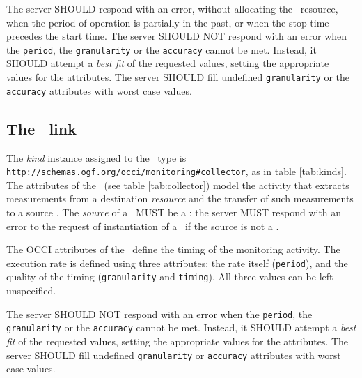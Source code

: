 \documentclass[10pt,a4paper]{article}
\begin{document}
The server SHOULD respond with an error, without allocating the \sens\ resource, when the period of operation is partially in the past, or when the stop time precedes the start time. The server SHOULD NOT respond with an error when the {\tt period}, the {\tt granularity} or the {\tt accuracy} cannot be met. Instead, it SHOULD attempt a {\em best fit} of the requested values, setting the appropriate values for the attributes. The server SHOULD fill undefined {\tt granularity} or the {\tt accuracy} attributes with worst case values. 

\subsection{The \coll\ link \label{sec:collector}}


The {\em kind} instance assigned to the \coll\ type is {\tt http://schemas.ogf.org/occi/monitoring\#collector}, as in table \ref{tab:kinds}. The attributes of the \coll\ (see table \ref{tab:collector}) model the activity that extracts measurements from a destination {\em resource} and the transfer of such measurements to a source \sens. The {\em source} of a \coll\ MUST be a \sens: the server MUST respond with an error to the request of instantiation of a \coll\ if the source is not a \sens.

The OCCI attributes of the \coll\ define the timing of the monitoring activity.
The execution rate is defined using three attributes: the rate itself (\verb|period|), and the quality of the timing ({\tt granularity} and {\tt timing}). All three values can be left unspecified.

The server SHOULD NOT respond with an error when the {\tt period}, the {\tt granularity} or the {\tt accuracy} cannot be met. Instead, it SHOULD attempt a {\em best fit} of the requested values, setting the appropriate values for the attributes. The server SHOULD fill undefined {\tt granularity} or {\tt accuracy} attributes with worst case values. 
\end{document}
